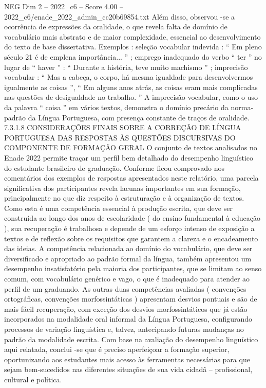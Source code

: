 \begin{textsample}{NEG Dim 2 – 2022\_c6 – Score 4.00 – 2022\_c6/enade\_2022\_admin\_cc20b69854.txt}
Além disso, observou -se a ocorrência de expressões da oralidade, o que revela falta de domínio de vocabulário mais abstrato e de maior complexidade, essencial ao desenvolvimento do texto de base dissertativa.
Exemplos : seleção vocabular indevida : “ Em pleno século 21 é de emplena importância... ” ; emprego inadequado do verbo “ ter ” no lugar de “ haver ” : “ Durante a história, teve muito machismo ” ; imprecisão vocabular : “ Mas a cabeça, o corpo, há mesma igualdade para desenvolvermos igualmente as coisas ”, “ Em alguns anos atrás, as coisas eram mais complicadas nas questões de desigualdade no trabalho. ” A imprecisão vocabular, como o uso da palavra “ coisa ” em vários textos, demonstra o domínio precário da norma-padrão da Língua Portuguesa, com presença constante de traços de oralidade. 7.3.1.8 CONSIDERAÇÕES FINAIS SOBRE A CORREÇÃO DE LÍNGUA PORTUGUESA DAS RESPOSTAS ÀS QUESTÕES DISCURSIVAS DO COMPONENTE DE FORMAÇÃO GERAL O conjunto de textos analisados no Enade 2022 permite traçar um perfil bem detalhado do desempenho linguístico do estudante brasileiro de graduação.
Conforme ficou comprovado nos comentários dos exemplos de respostas apresentados neste relatório, uma parcela significativa dos participantes revela lacunas importantes em sua formação, principalmente no que diz respeito à estruturação e à organização de textos.
Como esta é uma competência essencial à produção escrita, que deve ser construída ao longo dos anos de escolaridade ( do ensino fundamental à educação ), sua recuperação é trabalhosa e depende de um esforço intenso de exposição a textos e de reflexão sobre os requisitos que garantem a clareza e o encadeamento das ideias.
A competência relacionada ao domínio do vocabulário, que deve ser diversificado e apropriado ao padrão formal da língua, também apresentou um desempenho insatisfatório pela maioria dos participantes, que se limitam ao senso comum, com vocabulário genérico e vago, o que é inadequado para atender ao perfil de um graduando.
As outras duas competências avaliadas ( convenções ortográficas, convenções morfossintáticas ) apresentam desvios pontuais e são de mais fácil recuperação, com exceção dos desvios morfossintáticos que já estão incorporados na modalidade oral informal da Língua Portuguesa, configurando processos de variação linguística e, talvez, antecipando futuras mudanças no padrão da modalidade escrita.
Com base na avaliação do desempenho linguístico aqui relatada, conclui -se que é preciso aperfeiçoar a formação superior, oportunizando aos estudantes mais acesso às ferramentas necessárias para que sejam bem-sucedidos nas diferentes situações de sua vida cidadã – profissional, cultural e política.

\end{textsample}
